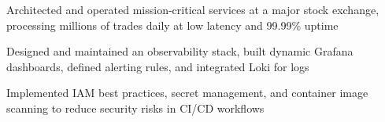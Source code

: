 \documentclass[]{willianpaixao-resume}
\begin{document}
\begin{minipage}[t]{0.68\textwidth}
\sectionsep
{}
\begin{tightemize}
\item Architected and operated mission-critical services at a major stock exchange, processing millions of trades daily at low latency and 99.99\% uptime
\item Designed and maintained an observability stack, built dynamic Grafana dashboards, defined alerting rules, and integrated Loki for logs
\item Implemented IAM best practices, secret management, and container image scanning to reduce security risks in CI/CD workflows
\end{tightemize}



\end{minipage}
\end{document}
